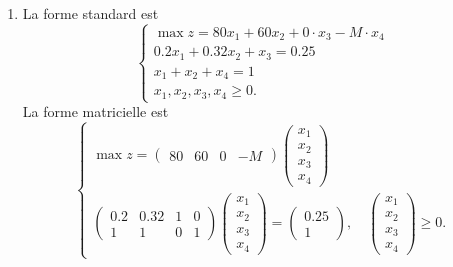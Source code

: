 {\begin{td-sol}[]
\begin{enumerate}
			\item La forme standard est
			\begin{equation*}
				\begin{cases}
					\max z = 80 x_1 + 60 x_2 + 0\cdot x_3 - M \cdot x_4\\
					0.2x_1 + 0.32 x_2 + x_3 = 0.25\\
					x_1 + x_2 + x_4 = 1 \\
					x_1, x_2, x_3, x_4 \geq 0.
				\end{cases}
			\end{equation*}
			La forme matricielle est
			\begin{equation*}
				\begin{cases}
					\max z = \begin{pmatrix} 80 & 60 & 0 & -M \end{pmatrix} \begin{pmatrix} x_1 \\ x_2 \\ x_3 \\ x_4 \end{pmatrix} \\
					\begin{pmatrix}
						0.2 & 0.32 & 1 & 0 \\
						1 & 1 & 0 & 1
					\end{pmatrix}
					\begin{pmatrix} x_1 \\ x_2 \\ x_3 \\ x_4 \end{pmatrix}
					=
					\begin{pmatrix} 0.25 \\ 1 \end{pmatrix},\quad
					\begin{pmatrix} x_1 \\ x_2 \\ x_3 \\ x_4 \end{pmatrix} \geq 0.
				\end{cases}
			\end{equation*}


\end{enumerate}
\end{td-sol}}
